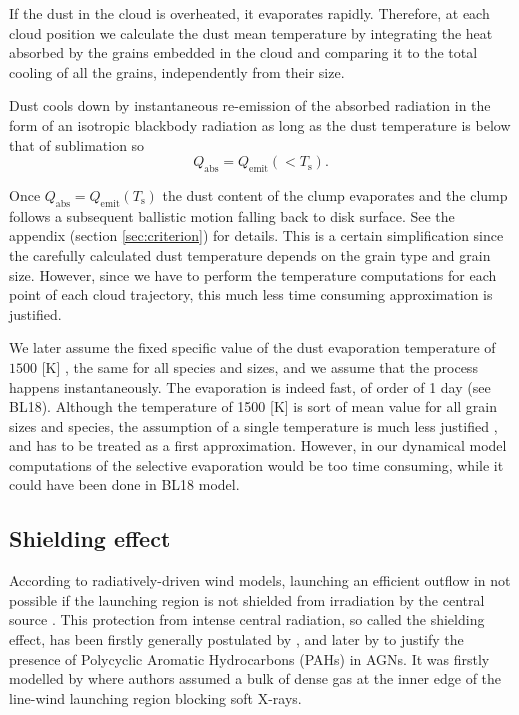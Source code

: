 \documentclass[twocolumn]{aastex62}
\begin{document}
If the dust in the cloud is overheated, it evaporates rapidly. Therefore, at each cloud position we calculate the dust mean temperature by integrating the heat absorbed by the grains embedded in the cloud and comparing it to the total cooling of all the grains, independently from their size. 

Dust cools down by instantaneous re-emission of the absorbed radiation in the form of an isotropic blackbody radiation as long as the dust temperature is below that of sublimation so
\begin{equation}
Q_{\mathrm{abs}} = Q_{\mathrm{emit}}(<T_{\mathrm{s}}).
\end{equation}

Once $Q_{\mathrm{abs}} = Q_{\mathrm{emit}}(T_{\mathrm{s}})$
the dust content of the clump evaporates and the clump follows a subsequent ballistic motion falling back to disk surface. See the appendix (section \ref{sec:criterion}) for details. This is a certain simplification since the carefully calculated dust temperature depends on the grain type and grain size. However, since we have to perform the temperature computations for each point of each cloud trajectory, this much less time consuming approximation is justified.

We later assume the fixed specific value of the dust evaporation temperature of $1500$ [K] \citep[e.g.][]{barvainis1987, li2007, Figaredo2020, Huang2020}, the same for all species and sizes, and we assume that the process happens instantaneously. The evaporation is indeed fast, of order of 1 day (see BL18). Although the temperature of 1500 [K] is sort of mean value for all grain sizes and species, the assumption of a single temperature is much less justified \citep[BL18,][]{tazaki2020, Temple2020}, and has to be treated as a first approximation. However, in our dynamical model computations of the selective evaporation would be too time consuming, while it could have been done in BL18 model.

\subsection{Shielding effect}\label{sec:shielding}

According to radiatively-driven wind models, launching an efficient outflow in not possible if the launching region is not shielded from irradiation by the central source \citep[see e.g.][]{gallagher2007,proga2007, higginbottom2014}. This protection from intense central radiation, so called the shielding effect, has been firstly generally postulated by \citet{shlosman1985}, and later by \citet{Voit1992} to justify the presence of Polycyclic Aromatic Hydrocarbons (PAHs) in AGNs.  It was firstly modelled by \citet{murray1995} where authors assumed a bulk of dense gas at the inner edge of the line-wind launching region blocking soft X-rays.
\end{document}
